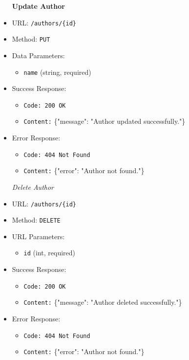 \begin{itemize}
\item[\textbf{Update Author}]
\item URL: \texttt{/authors/\{id\}}  
\item Method: \texttt{PUT}  
\item Data Parameters:
\begin{itemize}
  \item \texttt{name} (string, required)
\end{itemize}
\item Success Response:
\begin{itemize}
  \item \texttt{Code: 200 OK}  
  \item \texttt{Content:} \{"message": "Author updated successfully."\}
\end{itemize}
\item Error Response:
\begin{itemize}
  \item \texttt{Code: 404 Not Found}  
  \item \texttt{Content:} \{"error": "Author not found."\}
\end{itemize}

\item[\textit{Delete Author}] 
\item URL: \texttt{/authors/\{id\}}  
\item Method: \texttt{DELETE}  
\item URL Parameters:
\begin{itemize}
  \item \texttt{id} (int, required)
\end{itemize}
\item Success Response:
\begin{itemize}
  \item \texttt{Code: 200 OK}  
  \item \texttt{Content:} \{"message": "Author deleted successfully."\}
\end{itemize}
\item Error Response:
\begin{itemize}
  \item \texttt{Code: 404 Not Found}  
  \item \texttt{Content:} \{"error": "Author not found."\}
\end{itemize}


\end{itemize}
